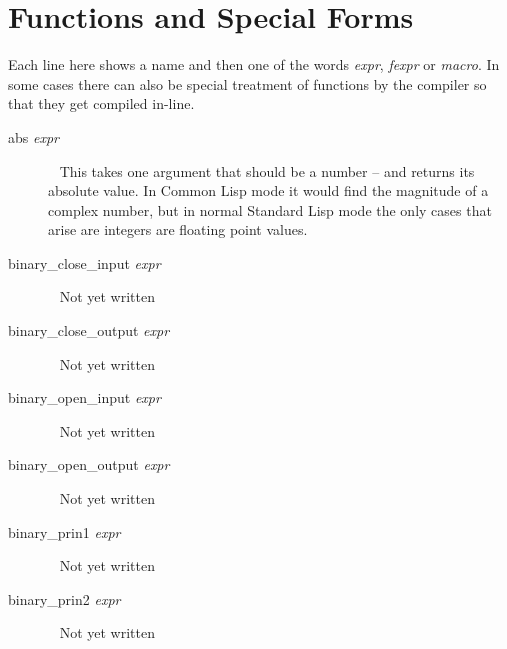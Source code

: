 \documentclass[a4paper,11pt]{article}
\begin{document}
\section{Functions and Special Forms}
  
Each line here shows a name and then one of the words {\itshape  expr},
{\itshape  fexpr} or {\itshape  macro}. In some cases there can also be special
treatment of functions by the compiler so that they get compiled in-line.
\begin{description}

\item [{\ttfamily abs} {\itshape  expr}]  ~\newline
This takes one argument that should be a number -- and returns its absolute
value. In Common Lisp mode it would find the magnitude of a complex
number, but in normal Standard Lisp mode the only cases that arise are
integers are floating point values.

\item [{\ttfamily binary\_close\_input} {\itshape  expr}]  ~\newline
Not yet written

\item [{\ttfamily binary\_close\_output} {\itshape  expr}]  ~\newline
Not yet written

\item [{\ttfamily binary\_open\_input} {\itshape  expr}]  ~\newline
Not yet written

\item [{\ttfamily binary\_open\_output} {\itshape  expr}]  ~\newline
Not yet written

\item [{\ttfamily binary\_prin1} {\itshape  expr}]  ~\newline
Not yet written

\item [{\ttfamily binary\_prin2} {\itshape  expr}]  ~\newline
Not yet written


\end{description}
\end{document}
